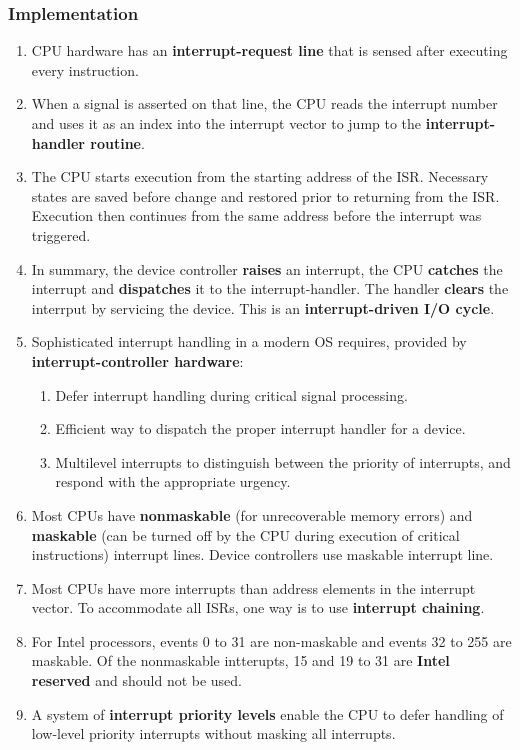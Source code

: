 \documentclass[journal,12pt,twocolumn]{IEEEtran}
\begin{document}
\subsubsection{Implementation}
\begin{enumerate}
    \item CPU hardware has an \textbf{interrupt-request line} that is sensed 
    after executing every instruction.
    \item When a signal is asserted on that line, the CPU reads the interrupt 
    number and uses it as an index into the interrupt vector to jump to the 
    \textbf{interrupt-handler routine}.
    \item The CPU starts execution from the starting address of the ISR. 
    Necessary states are saved before change and restored prior to returning 
    from the ISR. Execution then continues from the same address before the 
    interrupt was triggered.
    \item In summary, the device controller \textbf{raises} an interrupt, the 
    CPU \textbf{catches} the interrupt and \textbf{dispatches} it to the 
    interrupt-handler. The handler \textbf{clears} the interrput by servicing 
    the device. This is an \textbf{interrupt-driven I/O cycle}.
    \item Sophisticated interrupt handling in a modern OS requires, provided by 
    \textbf{interrupt-controller hardware}:
    \begin{enumerate}
        \item Defer interrupt handling during critical signal processing.
        \item Efficient way to dispatch the proper interrupt handler for a 
        device.
        \item Multilevel interrupts to distinguish between the priority of 
        interrupts, and respond with the appropriate urgency.
    \end{enumerate}
    \item Most CPUs have \textbf{nonmaskable} (for unrecoverable memory errors) 
    and \textbf{maskable} (can be turned off by the CPU during execution of 
    critical instructions) interrupt lines. Device controllers use maskable 
    interrupt line.
    \item Most CPUs have more interrupts than address elements in the interrupt 
    vector. To accommodate all ISRs, one way is to use \textbf{interrupt chaining}.
    \item For Intel processors, events 0 to 31 are non-maskable and events 32 
    to 255 are maskable. Of the nonmaskable intterupts, 15 and 19 to 31 are 
    \textbf{Intel reserved} and should not be used.
    \item A system of \textbf{interrupt priority levels} enable the CPU to 
    defer handling of low-level priority interrupts without masking all 
    interrupts.
\end{enumerate}
\end{document}
